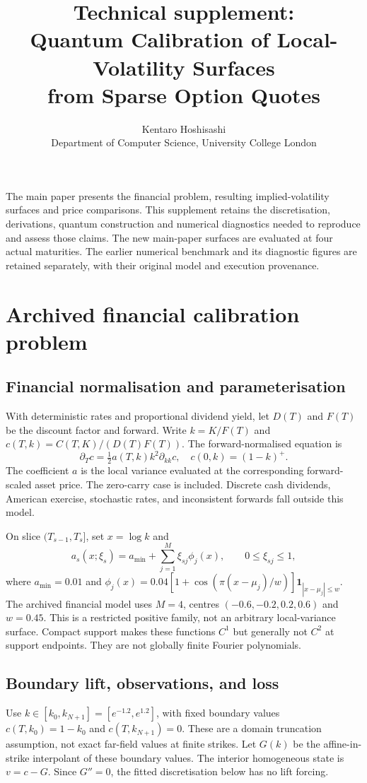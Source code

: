\documentclass[10pt]{article}
\title{Technical supplement:\\Quantum Calibration of Local-Volatility Surfaces\\from Sparse Option Quotes}
\author{Kentaro Hoshisashi\\ \small Department of Computer Science, University College London}\date{}
\begin{document}
\maketitle
The main paper presents the financial problem, resulting implied-volatility
surfaces and price comparisons. This supplement retains the discretisation,
derivations, quantum construction and numerical diagnostics needed to reproduce
and assess those claims. The new main-paper surfaces are evaluated at four
actual maturities. The earlier numerical benchmark and its diagnostic figures
are retained separately, with their original model and execution provenance.
\tableofcontents

\section{Archived financial calibration problem}
\subsection{Financial normalisation and parameterisation}
With deterministic rates and proportional dividend yield, let $D(T)$ and $F(T)$ be the discount factor and forward. Write $k=K/F(T)$ and $c(T,k)=C(T,K)/(D(T)F(T))$. The forward-normalised equation is
\begin{equation}
 \partial_T c=\tfrac12 a(T,k)k^2\partial_{kk}c,\quad
 c(0,k)=(1-k)^+ . \label{eq:dupire}
\end{equation}
The coefficient $a$ is the local variance evaluated at the corresponding forward-scaled asset price. The zero-carry case is included. Discrete cash dividends, American exercise, stochastic rates, and inconsistent forwards fall outside this model.

On slice $(T_{s-1},T_s]$, set $x=\log k$ and
\begin{equation}
 a_s(x;\xi_s)=a_{\min}+\sum_{j=1}^M\xi_{sj}\phi_j(x),\qquad 0\leq\xi_{sj}\leq1, \label{eq:basis}
\end{equation}
where $a_{\min}=0.01$ and
$\phi_j(x)=0.04[1+\cos(\pi(x-\mu_j)/w)]\mathbf1_{|x-\mu_j|\leq w}$.
The archived financial model uses $M=4$, centres $(-0.6,-0.2,0.2,0.6)$ and $w=0.45$. This is a restricted positive family, not an arbitrary local-variance surface. Compact support makes these functions $C^1$ but generally not $C^2$ at support endpoints. They are not globally finite Fourier polynomials.

\subsection{Boundary lift, observations, and loss}
Use $k\in[k_0,k_{N+1}]=[e^{-1.2},e^{1.2}]$, with fixed boundary values $c(T,k_0)=1-k_0$ and $c(T,k_{N+1})=0$. These are a domain truncation assumption, not exact far-field values at finite strikes. Let $G(k)$ be the affine-in-strike interpolant of these boundary values. The interior homogeneous state is $v=c-G$. Since $G''=0$, the fitted discretisation below has no lift forcing.
\end{document}
